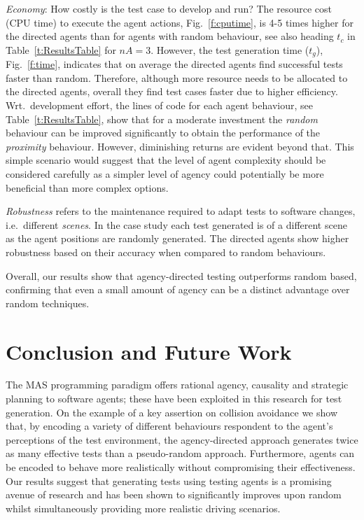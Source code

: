 \documentclass[runningheads,a4paper]{llncs}
\begin{document}
\textit{Economy}: How costly is the test case to develop and run? %
The resource cost (CPU time) to execute the agent actions, Fig.~\ref{f:cputime}, is 4-5 times higher for the directed agents than for agents with random behaviour, see also heading $t_{c}$ in Table~\ref{t:ResultsTable} for $nA=3$. However, the test generation time ($t_g$), Fig.~\ref{f:time}, indicates that on average the directed agents find successful tests faster than random. Therefore, although more resource needs to be  allocated to the directed agents, overall they find test cases faster due to higher efficiency. Wrt.\ development effort, the lines of code for each agent behaviour, see Table~\ref{t:ResultsTable}, show that for a moderate investment the \textit{random} behaviour can be improved significantly to obtain the performance of the \textit{proximity} behaviour. However, diminishing returns are evident beyond that. This simple scenario would suggest that the level of agent complexity should be considered carefully as a simpler level of agency could potentially be more beneficial than more complex options. 

\textit{Robustness} refers to the maintenance required to adapt tests to software changes, i.e.\ different \textit{scenes}. In the case study each test generated is of a different scene as the agent positions are randomly generated. The directed agents show higher robustness based on their accuracy when compared to random behaviours. 

Overall, our results show that agency-directed testing outperforms random based, confirming that even a small amount of agency can be a distinct advantage over random techniques. 

\section{Conclusion and Future Work}\label{s:conclusion}
The MAS programming paradigm offers rational agency, causality and strategic planning to software agents; these have been exploited in this research for test generation. On the example of a key assertion on collision avoidance we show that, by encoding a variety of different behaviours respondent to the agent's perceptions of the test environment, the agency-directed approach generates twice as many effective tests than a pseudo-random approach. Furthermore, agents can be encoded to behave more realistically without compromising their effectiveness. Our results suggest that generating tests using testing agents is a promising avenue of research and has been shown to significantly improves upon random whilst simultaneously providing more realistic driving scenarios.
\end{document}
